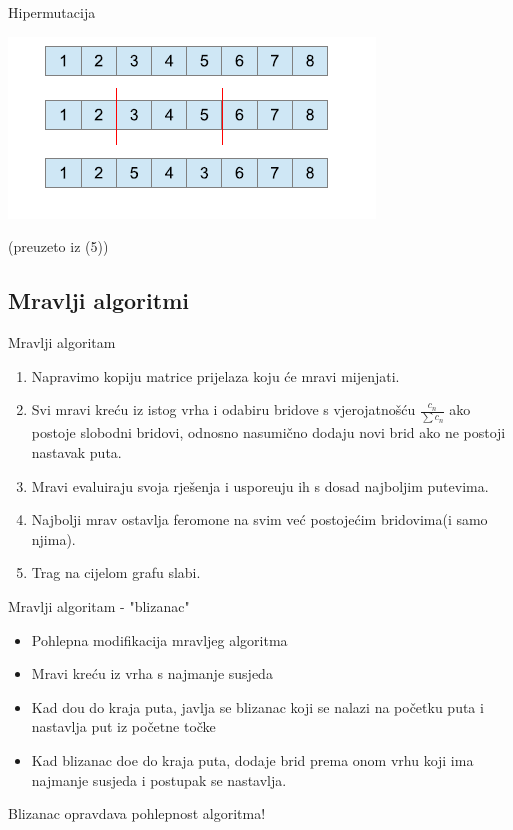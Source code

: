 \documentclass{beamer}
\begin{document}
\begin{frame}{Hipermutacija}
\begin{center}
\includegraphics[scale = 0.6]{mutacija.png}
\end{center}
\begin{center} \tiny (preuzeto iz (5)) \end{center}
\end{frame}

\subsection{Mravlji algoritmi}
\begin{frame}{Mravlji algoritam}

\begin{enumerate}
\item Napravimo kopiju matrice prijelaza koju \'{c}e mravi mijenjati.
\item Svi mravi kre\'{c}u iz istog vrha i odabiru bridove s vjerojatno\v{s}\'{c}u $\frac{c_n}{\sum{c_n}}  $ ako postoje slobodni bridovi, odnosno nasumi\v{c}no dodaju novi brid ako ne postoji nastavak puta.
\item Mravi evaluiraju svoja rje\v{s}enja i uspore\dj{}uju ih s dosad najboljim putevima.
\item Najbolji mrav ostavlja feromone na svim ve\'{c} postoje\'{c}im bridovima(i samo njima).
\item Trag na cijelom grafu slabi. 

\end{enumerate}

\end{frame}

\begin{frame}{Mravlji algoritam - "blizanac"}

\begin{itemize}
\item Pohlepna modifikacija mravljeg algoritma
\item Mravi kre\'{c}u iz vrha s najmanje susjeda
\item Kad do\dj{}u do kraja puta, javlja se blizanac koji se nalazi na po\v{c}etku puta i nastavlja put iz po\v{c}etne to\v{c}ke
\item Kad blizanac do\dj{}e do kraja puta, dodaje brid prema onom vrhu koji ima najmanje susjeda i postupak se nastavlja.
 
\end{itemize}

Blizanac opravdava pohlepnost algoritma!

\end{frame}
\end{document}

